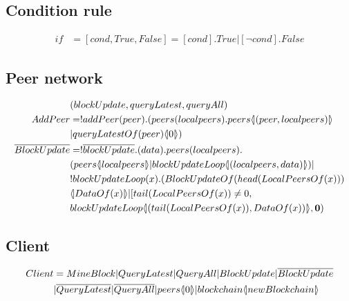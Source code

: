 \subsection{Condition rule}

\begin{align*}
    if &= [cond,True,False] = [cond].True|[\neg cond].False
\end{align*}

\subsection{Peer network}

\begin{align*}
    &(blockUpdate, queryLatest, queryAll)\\
    AddPeer &= !addPeer(peer).(peers(localpeers).peers\lift{}{(peer,localpeers)}\\
        &|queryLatestOf(peer)\lift{}{0})\\
    \overline{BlockUpdate} &= !\overline{blockUpdate}.(data).peers(localpeers).\\
        &(peers\lift{}{localpeers}|blockUpdateLoop\lift{}{(localpeers,data)})|\\
        &!blockUpdateLoop(x).(BlockUpdateOf(head(LocalPeersOf(x)))\\
        &\lift{}{DataOf(x)}|[tail(LocalPeersOf(x))\not= 0,\\
        &blockUpdateLoop\lift{}{(tail(LocalPeersOf(x)),DataOf(x))},\nil)
\end{align*}

\subsection{Client}

\begin{align*}
    Client &= MineBlock|QueryLatest|QueryAll|BlockUpdate|\overline{BlockUpdate}\\
    &|\overline{QueryLatest}|\overline{QueryAll}|peers \langle \! | 0 | \! \rangle|blockchain \langle \! | newBlockchain | \! \rangle
\end{align*}